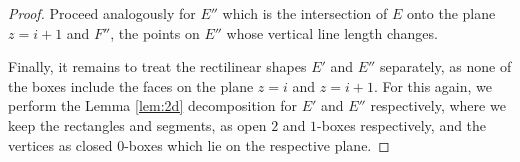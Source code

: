 \begin{proof}
Proceed analogously for $E''$ which is the intersection of $E$ onto the plane $z=i+1$ and $F''$, the points on $E''$ whose vertical line length changes.

Finally, it remains to treat the rectilinear shapes $E'$ and $E''$ separately, as none of the boxes include the faces on the plane $z=i$ and $z=i+1$.
For this again, we perform the Lemma \ref{lem:2d} decomposition for $E'$ and $E''$ respectively, where we keep the rectangles and segments, as open $2$ and $1$-boxes respectively, and the vertices 
as closed $0$-boxes which lie on the respective plane.
\end{proof}


  

